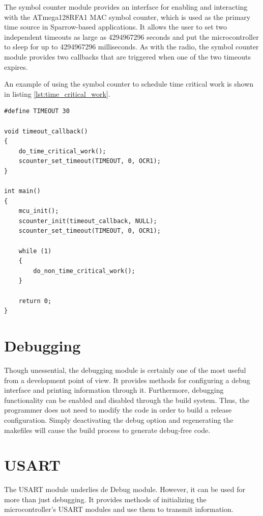 The symbol counter module provides an interface for enabling and interacting
with the \mbox{ATmega128RFA1} MAC symbol counter, which is used as the primary
time source in Sparrow-based applications. It allows the user to set two
independent timeouts as large as 4294967296 seconds and put the microcontroller
to sleep for up to 4294967296 milliseconds. As with the radio, the symbol
counter module provides two callbacks that are triggered when one of the two
timeouts expires.

An example of using the symbol counter to schedule time critical work is shown
in listing \ref{lst:time_critical_work}.

\lstset{
	language=C, numbers=none, caption=Time critical work snippet,
	label=lst:time_critical_work
}
\begin{lstlisting}
#define TIMEOUT	30

void timeout_callback()
{
	do_time_critical_work();
	scounter_set_timeout(TIMEOUT, 0, OCR1);
}

int main()
{
	mcu_init();
	scounter_init(timeout_callback, NULL);
	scounter_set_timeout(TIMEOUT, 0, OCR1);

	while (1)
	{
		do_non_time_critical_work();
	}

	return 0;
}
\end{lstlisting}

\section{Debugging}

Though unessential, the debugging module is certainly one of the most useful
from a development point of view. It provides methods for configuring a debug
interface and printing information through it. Furthermore, debugging
functionality can be enabled and disabled through the build system. Thus, the
programmer does not need to modify the code in order to build a release
configuration. Simply deactivating the debug option and regenerating the
makefiles will cause the build process to generate debug-free code.

\section{USART}

The USART module underlies de Debug module. However, it can be used for more
than just debugging. It provides methods of initializing the microcontroller's
USART modules and use them to transmit information.

